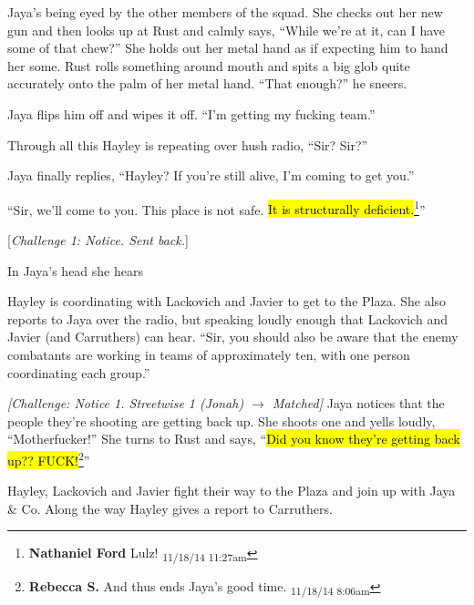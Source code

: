 Jaya's being eyed by the other members of the squad.  She checks out her new gun and then looks up at Rust and calmly says, ``While we're at it, can I have some of that chew?''  She holds out her metal hand as if expecting him to hand her some.  Rust rolls something around mouth and spits a big glob quite accurately onto the palm of her metal hand.  ``That enough?'' he sneers.  

Jaya flips him off and wipes it off.  ``I'm getting my fucking team.''



Through all this Hayley is repeating over hush radio, ``Sir?  Sir?''

Jaya finally replies, ``Hayley?  If you're still alive, I'm coming to get you.''

``Sir, we'll come to you.  This place is not safe. \hl{It is structurally deficient.}\footnote{\textbf{Nathaniel Ford }Lulz! \textsubscript{11/18/14 11:27am}}''

{[}\textit{Challenge 1: Notice.  Sent back.}{]}

In Jaya's head she hears  



Hayley is coordinating with Lackovich and Javier to get to the Plaza.  She also reports to Jaya over the radio, but speaking loudly enough that Lackovich and Javier (and Carruthers) can hear.  ``Sir, you should also be aware that the enemy combatants are working in teams of approximately ten, with one person coordinating each group.''



\textit{{[}Challenge: Notice 1.  Streetwise 1 (Jonah) $\rightarrow$ Matched{]}  }Jaya notices that the people they're shooting are getting back up.  She shoots one and yells loudly, ``Motherfucker!''  She turns to Rust and says, ``\hl{Did you know they're getting back up?? FUCK!}\footnote{\textbf{Rebecca S. }And thus ends Jaya's good time. \textsubscript{11/18/14 8:06am}}''



Hayley, Lackovich and Javier fight their way to the Plaza and join up with Jaya \& Co.  Along the way Hayley gives a report to Carruthers.    {\color[RGB]{255,153,0} } 

